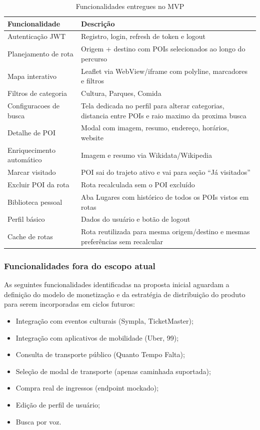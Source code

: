 \documentclass[12pt, a4paper]{article}
\begin{document}
\begin{table}[H]
\centering
\caption{Funcionalidades entregues no MVP}
\begin{tabular}{lp{9cm}}
\toprule
\textbf{Funcionalidade} & \textbf{Descri\c{c}\~ao} \\
\midrule
Autentica\c{c}\~ao JWT & Registro, login, refresh de token e logout \\
Planejamento de rota & Origem + destino com POIs selecionados ao longo do percurso \\
Mapa interativo & Leaflet via WebView/iframe com polyline, marcadores e filtros \\
Filtros de categoria & Cultura, Parques, Comida \\
Configuracoes de busca & Tela dedicada no perfil para alterar categorias, distancia entre POIs e raio maximo da proxima busca \\
Detalhe de POI & Modal com imagem, resumo, endere\c{c}o, hor\'arios, website \\
Enriquecimento autom\'atico & Imagem e resumo via Wikidata/Wikipedia \\
Marcar visitado & POI sai do trajeto ativo e vai para se\c{c}\~ao ``J\'a visitados'' \\
Excluir POI da rota & Rota recalculada sem o POI exclu\'ido \\
Biblioteca pessoal & Aba Lugares com hist\'orico de todos os POIs vistos em rotas \\
Perfil b\'asico & Dados do usu\'ario e bot\~ao de logout \\
Cache de rotas & Rota reutilizada para mesma origem/destino e mesmas prefer\^encias sem recalcular \\
\bottomrule
\end{tabular}
\end{table}

\subsubsection{Funcionalidades fora do escopo atual}

As seguintes funcionalidades identificadas na proposta inicial aguardam a defini\c{c}\~ao do modelo de monetiza\c{c}\~ao e da estrat\'egia de distribui\c{c}\~ao do produto para serem incorporadas em ciclos futuros:

\begin{itemize}
  \item Integra\c{c}\~ao com eventos culturais (Sympla, TicketMaster);
  \item Integra\c{c}\~ao com aplicativos de mobilidade (Uber, 99);
  \item Consulta de transporte p\'ublico (Quanto Tempo Falta);
  \item Sele\c{c}\~ao de modal de transporte (apenas caminhada suportada);
  \item Compra real de ingressos (endpoint mockado);
  \item Edi\c{c}\~ao de perfil de usu\'ario;
  \item Busca por voz.
\end{itemize}
\end{document}
